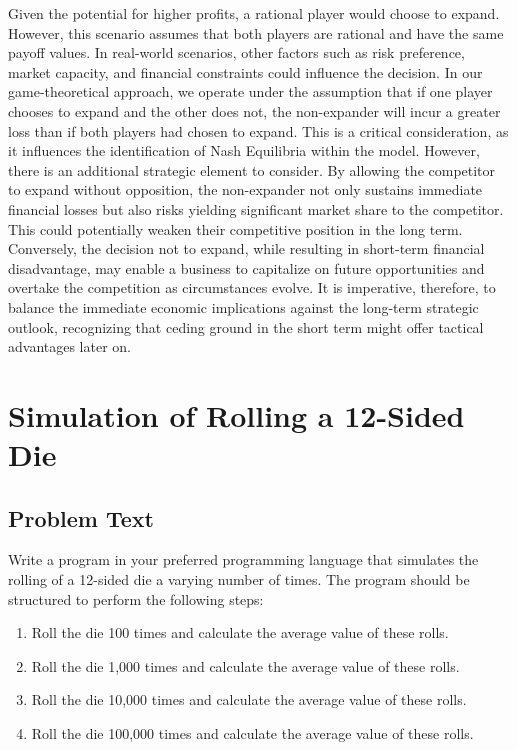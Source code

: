 \documentclass[a4paper, 10pt]{article}
\begin{document}
            Given the potential for higher profits, a rational player would choose to expand. However, this scenario assumes that both players are rational and have the same payoff values. In real-world scenarios, other factors such as risk preference, market capacity, and financial constraints could influence the decision.
            In our game-theoretical approach, we operate under the assumption that if one player chooses to expand and the other does not, the non-expander will incur a greater loss than if both players had chosen to expand. This is a critical consideration, as it influences the identification of Nash Equilibria within the model. However, there is an additional strategic element to consider. By allowing the competitor to expand without opposition, the non-expander not only sustains immediate financial losses but also risks yielding significant market share to the competitor. This could potentially weaken their competitive position in the long term. Conversely, the decision not to expand, while resulting in short-term financial disadvantage, may enable a business to capitalize on future opportunities and overtake the competition as circumstances evolve. It is imperative, therefore, to balance the immediate economic implications against the long-term strategic outlook, recognizing that ceding ground in the short term might offer tactical advantages later on.

    \section{Simulation of Rolling a 12-Sided Die}
        \subsection{Problem Text}
            Write a program in your preferred programming language that simulates the rolling of a 12-sided die a varying number of times. The program should be structured to perform the following steps:

            \begin{enumerate}
                \item Roll the die 100 times and calculate the average value of these rolls.
                \item Roll the die 1,000 times and calculate the average value of these rolls.
                \item Roll the die 10,000 times and calculate the average value of these rolls.
                \item Roll the die 100,000 times and calculate the average value of these rolls.
            \end{enumerate}
\end{document}
